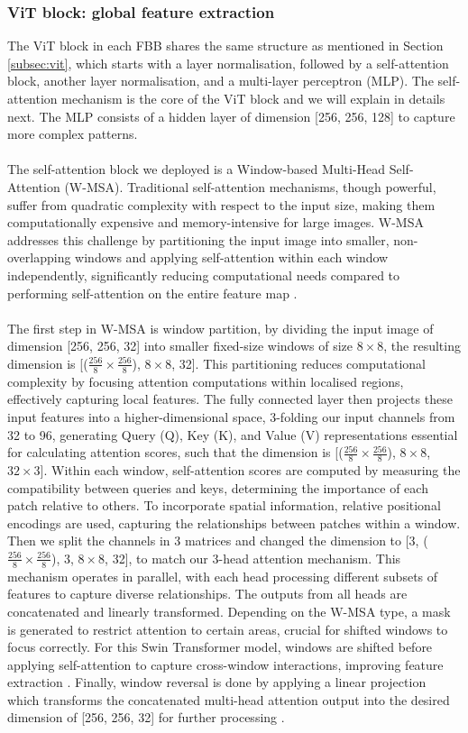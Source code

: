 \subsubsection{ViT block: global feature extraction}
The ViT block in each FBB shares the same structure as mentioned in Section \ref{subsec:vit}, which starts with a layer normalisation, followed by a self-attention block, another layer normalisation, and a multi-layer perceptron (MLP). The self-attention mechanism is the core of the ViT block and we will explain in details next. The MLP consists of a hidden layer of dimension [256, 256, 128] to capture more complex patterns.
\\\\
The self-attention block we deployed is a Window-based Multi-Head Self-Attention (W-MSA). Traditional self-attention mechanisms, though powerful, suffer from quadratic complexity with respect to the input size, making them computationally expensive and memory-intensive for large images. W-MSA addresses this challenge by partitioning the input image into smaller, non-overlapping windows and applying self-attention within each window independently, significantly reducing computational needs compared to performing self-attention on the entire feature map \cite{li2021local}.
\\\\
The first step in W-MSA is window partition, by dividing the input image of dimension [256, 256, 32] into smaller fixed-size windows of size $8\times8$, the resulting dimension is [($\frac{256}{8}\times\frac{256}{8}$), $8\times8$, 32]. This partitioning reduces computational complexity by focusing attention computations within localised regions, effectively capturing local features. The fully connected layer then projects these input features into a higher-dimensional space, 3-folding our input channels from 32 to 96, generating Query (Q), Key (K), and Value (V) representations essential for calculating attention scores, such that the dimension is [($\frac{256}{8}\times\frac{256}{8}$), $8\times8$, $32\times3$]. Within each window, self-attention scores are computed by measuring the compatibility between queries and keys, determining the importance of each patch relative to others. To incorporate spatial information, relative positional encodings are used, capturing the relationships between patches within a window. Then we split the channels in 3 matrices and changed the dimension to [3, ($\frac{256}{8}\times\frac{256}{8}$), 3, $8\times8$, 32], to match our 3-head attention mechanism. This mechanism operates in parallel, with each head processing different subsets of features to capture diverse relationships. The outputs from all heads are concatenated and linearly transformed. Depending on the W-MSA type, a mask is generated to restrict attention to certain areas, crucial for shifted windows to focus correctly. For this Swin Transformer model, windows are shifted before applying self-attention to capture cross-window interactions, improving feature extraction \cite{liu2021swin}. Finally, window reversal is done by applying a linear projection which transforms the concatenated multi-head attention output into the desired dimension of [256, 256, 32] for further processing \cite{javashs2023scrn}.

